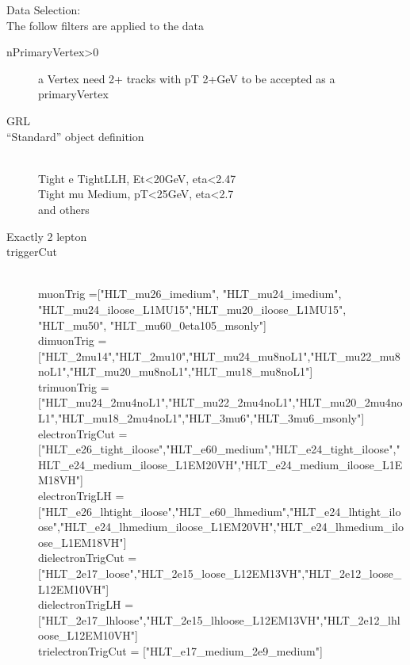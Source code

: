 Data Selection:\\
The follow filters are applied to the data 
\begin{description}


\item [nPrimaryVertex>0] a Vertex need 2+ tracks with pT 2+GeV to be accepted as a primaryVertex
\item [GRL]
\item [“Standard” object definition] \ \\
Tight e TightLLH, Et<20GeV, eta<2.47 \\
Tight mu Medium, pT<25GeV, eta<2.7 \\
and others\\

\item [Exactly 2 lepton]
\item [triggerCut] \ \\

muonTrig =["HLT\_mu26\_imedium", "HLT\_mu24\_imedium", "HLT\_mu24\_iloose\_L1MU15","HLT\_mu20\_iloose\_L1MU15", "HLT\_mu50", "HLT\_mu60\_0eta105\_msonly"]\\

dimuonTrig = ["HLT\_2mu14","HLT\_2mu10","HLT\_mu24\_mu8noL1","HLT\_mu22\_mu8noL1","HLT\_mu20\_mu8noL1","HLT\_mu18\_mu8noL1"]\\

trimuonTrig = ["HLT\_mu24\_2mu4noL1","HLT\_mu22\_2mu4noL1","HLT\_mu20\_2mu4noL1","HLT\_mu18\_2mu4noL1","HLT\_3mu6","HLT\_3mu6\_msonly"]\\

electronTrigCut = ["HLT\_e26\_tight\_iloose","HLT\_e60\_medium","HLT\_e24\_tight\_iloose","HLT\_e24\_medium\_iloose\_L1EM20VH","HLT\_e24\_medium\_iloose\_L1EM18VH"]\\

electronTrigLH = ["HLT\_e26\_lhtight\_iloose","HLT\_e60\_lhmedium","HLT\_e24\_lhtight\_iloose","HLT\_e24\_lhmedium\_iloose\_L1EM20VH","HLT\_e24\_lhmedium\_iloose\_L1EM18VH"]\\

dielectronTrigCut = ["HLT\_2e17\_loose","HLT\_2e15\_loose\_L12EM13VH","HLT\_2e12\_loose\_L12EM10VH"]\\

dielectronTrigLH = ["HLT\_2e17\_lhloose","HLT\_2e15\_lhloose\_L12EM13VH","HLT\_2e12\_lhloose\_L12EM10VH"]\\

trielectronTrigCut = ["HLT\_e17\_medium\_2e9\_medium"]\\


\end{description}
